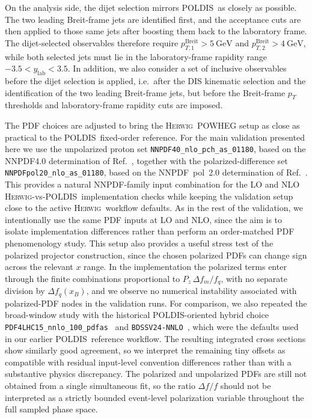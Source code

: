 \documentclass[a4paper,11pt]{article}
\newcommand{\Herwig}{\textsc{Herwig}}
\newcommand{\POLDIS}{\textsc{POLDIS}}
\begin{document}
On the analysis side, the dijet selection mirrors \POLDIS\ as closely
as possible. The two leading Breit-frame jets are identified first, and the
acceptance cuts are then applied to those same jets after boosting them back to
the laboratory frame. The dijet-selected observables therefore require
$p_{T,1}^{\mathrm{Breit}}>5~\mathrm{GeV}$ and
$p_{T,2}^{\mathrm{Breit}}>4~\mathrm{GeV}$, while both selected jets must lie in
the laboratory-frame rapidity range $-3.5<y_{\mathrm{lab}}<3.5$. In addition,
we also consider a set of inclusive observables before the dijet selection is applied, i.e.\ after the DIS
kinematic selection and the identification of the two leading Breit-frame jets,
but before the Breit-frame $p_T$ thresholds and laboratory-frame rapidity cuts
are imposed.

The PDF choices are adjusted to bring the \Herwig\ \textsc{POWHEG} setup as
close as practical to the \POLDIS\ fixed-order reference. For the main
validation presented here we use the unpolarized proton set
\texttt{NNPDF40\_nlo\_pch\_as\_01180}, based on the NNPDF4.0 determination
of Ref.~\cite{Ball:2022proton}, together with the polarized-difference set
\texttt{NNPDFpol20\_nlo\_as\_01180}, based on the NNPDF~pol~2.0 determination
of Ref.~\cite{Cruz-Martinez:2025nnpdfpol20}. This provides a natural
NNPDF-family input combination for the LO and NLO \Herwig-vs-\POLDIS\
implementation checks while keeping the validation setup close to the active
\Herwig\ workflow defaults. As in the rest of the validation, we intentionally
use the same PDF inputs at LO and NLO, since the aim is to isolate
implementation differences rather than perform an order-matched PDF
phenomenology study.
This setup also provides a useful stress test of the polarized projector
construction, since the chosen polarized PDFs can change sign across the
relevant $x$ range. In the implementation the polarized terms enter through the
finite combinations proportional to $P_z\,\Delta f_m/f_q$, with no separate
division by $\Delta f_q(x_B)$, and we observe no numerical instability
associated with polarized-PDF nodes in the validation runs.
For comparison, we also repeated the broad-window study with the historical
\POLDIS-oriented hybrid choice
\texttt{PDF4LHC15\_nnlo\_100\_pdfas}~\cite{Butterworth:2015oua} and
\texttt{BDSSV24-NNLO}~\cite{Borsa:2024mss}, which were the defaults used in our
earlier \POLDIS\ reference workflow. The resulting integrated cross sections
show similarly good agreement, so we interpret the remaining tiny offsets as
compatible with residual input-level convention differences rather than with a
substantive physics discrepancy. The polarized and unpolarized PDFs are still
not obtained from a single simultaneous fit, so the ratio $\Delta f/f$ should
not be interpreted as a strictly bounded event-level polarization variable
throughout the full sampled phase space.
\end{document}
